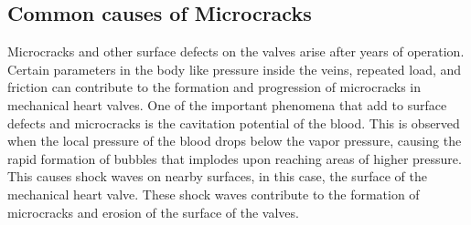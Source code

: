 \subsection*{Common causes of Microcracks}
Microcracks and other surface defects on the valves arise after years of operation. Certain parameters in the body like pressure inside the veins, repeated load, and friction can contribute to the formation and progression of microcracks in mechanical heart valves. One of the important phenomena that add to surface defects and microcracks is the cavitation potential of the blood.\cite*{zhang1995} This is observed when the local pressure of the blood drops below the vapor pressure, causing the rapid formation of bubbles that implodes upon reaching areas of higher pressure. This causes shock waves on nearby surfaces, in this case, the surface of the mechanical heart valve.\cite*{wu2001} These shock waves contribute to the formation of microcracks and erosion of the surface of the valves.

